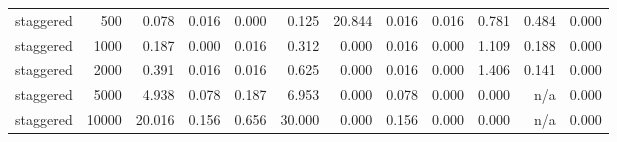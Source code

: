 \begin{table}[htbp]
\begin{tabular}{lrrrrrrrrrrr}
staggered & 500 & 0.078 & 0.016 & 0.000 & 0.125 & 20.844 & 0.016 & 0.016 & 0.781 & 0.484 & 0.000 \\
staggered & 1000 & 0.187 & 0.000 & 0.016 & 0.312 & 0.000 & 0.016 & 0.000 & 1.109 & 0.188 & 0.000 \\
staggered & 2000 & 0.391 & 0.016 & 0.016 & 0.625 & 0.000 & 0.016 & 0.000 & 1.406 & 0.141 & 0.000 \\
staggered & 5000 & 4.938 & 0.078 & 0.187 & 6.953 & 0.000 & 0.078 & 0.000 & 0.000 & n/a & 0.000 \\
staggered & 10000 & 20.016 & 0.156 & 0.656 & 30.000 & 0.000 & 0.156 & 0.000 & 0.000 & n/a & 0.000 \\
\bottomrule
\end{tabular}
\end{table}
